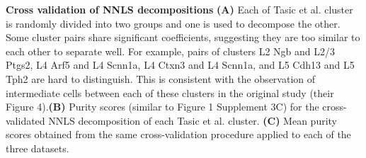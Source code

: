 \textbf{Cross validation of NNLS decompositions}
\textbf{(A)} Each of Tasic et al. cluster is randomly divided into two groups and one is used to decompose the other. Some cluster pairs share significant coefficients, suggesting they are too similar to each other to separate well. For example, pairs of clusters L2 Ngb and L2/3 Ptgs2, L4 Arf5 and L4 Scnn1a, L4 Ctxn3 and L4 Scnn1a, and L5 Cdh13 and L5 Tph2 are hard to distinguish. This is consistent with the observation of intermediate cells between each of these clusters in the original study (their Figure 4).\textbf{(B)} Purity scores (similar to Figure 1 Supplement 3C) for the cross-validated NNLS decomposition of each Tasic et al. cluster. \textbf{(C)} Mean purity scores obtained from the same cross-validation procedure applied to each of the three datasets. 